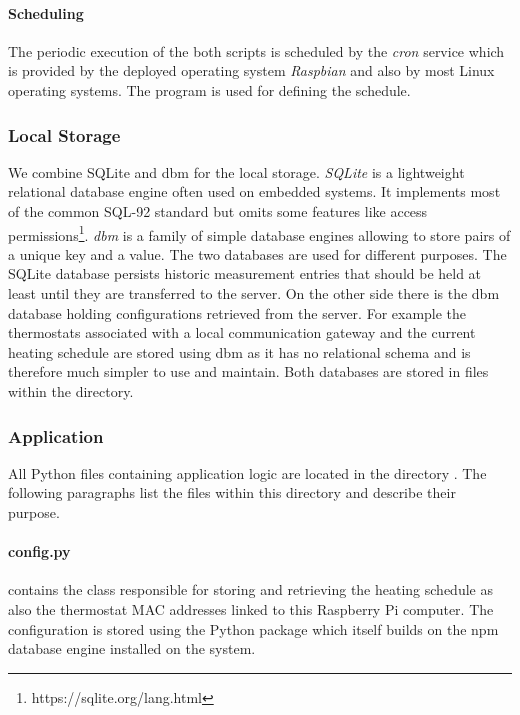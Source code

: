 \paragraph{Scheduling}

The periodic execution of the both scripts is scheduled by the \emph{cron} service which is provided by the deployed operating system \emph{Raspbian} and also by most Linux operating systems.
The  program is used for defining the schedule.

\subsubsection{Local Storage}
\label{sec:local_infrastructure_implementation_storage}

We combine SQLite and dbm for the local storage.
\emph{SQLite} is a lightweight relational database engine often used on embedded systems.
It implements most of the common SQL-92 standard but omits some features like access permissions\footnote{https://sqlite.org/lang.html}.
\emph{dbm} is a family of simple database engines allowing to store pairs of a unique key and a value.
The two databases are used for different purposes.
The SQLite database persists historic measurement entries that should be held at least until they are transferred to the server.
On the other side there is the dbm database holding configurations retrieved from the server.
For example the thermostats associated with a local communication gateway and the current heating schedule are stored using dbm as it has no relational schema and is therefore much simpler to use and maintain.
Both databases are stored in files within the  directory.

\subsubsection{Application}

All Python files containing application logic are located in the directory .
The following paragraphs list the files within this directory and describe their purpose.


\paragraph{config.py} contains the  class responsible for storing and retrieving the heating schedule as also the thermostat MAC addresses linked to this Raspberry Pi computer.
The configuration is stored using the  Python package which itself builds on the npm database engine installed on the system.


